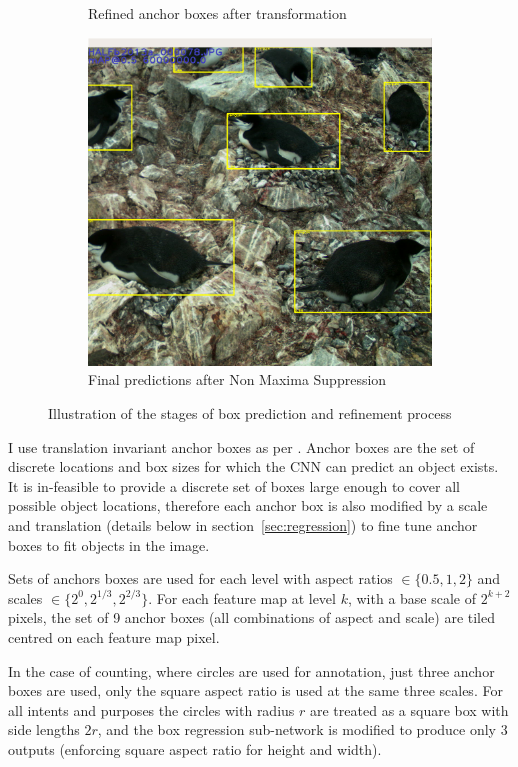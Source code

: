 \begin{figure}
\begin{subfigure}[t]{0.33\textwidth}
  \caption{Refined anchor boxes after transformation}
  \end{subfigure}%
  \begin{subfigure}[t]{0.35\textwidth}
  \includegraphics[width=0.95\linewidth]{figures/object/final.png}
  \caption{Final predictions after Non Maxima Suppression}
  \end{subfigure}%
  \caption{Illustration of the stages of box prediction and refinement process}
  \label{fig:anchor_boxes}
\end{figure}


I use translation invariant anchor boxes as per \cite{Wang2017}. Anchor boxes are the set of discrete locations and box sizes for which the \gls{CNN} can predict an object exists. It is in-feasible to provide a discrete set of boxes large enough to cover all possible object locations, therefore each anchor box is also modified by a scale and translation (details below in section~\ref{sec:regression}) to fine tune anchor boxes to fit objects in the image.

Sets of anchors boxes are used for each level with aspect ratios $ \in \{0.5, 1, 2\} $ and scales $ \in \{2^0, 2^{1/3}, 2^{2/3}\} $. For each feature map at level $k$, with a base scale of $ 2^{k + 2} $ pixels, the set of 9 anchor boxes (all combinations of aspect and scale) are tiled centred on each feature map pixel. 

In the case of counting, where circles are used for annotation, just three anchor boxes are used, only the square aspect ratio is used at the same three scales. For all intents and purposes the circles with radius $r$ are treated as a square box with side lengths $2r$, and the box regression sub-network is modified to produce only $3$ outputs (enforcing square aspect ratio for height and width).

